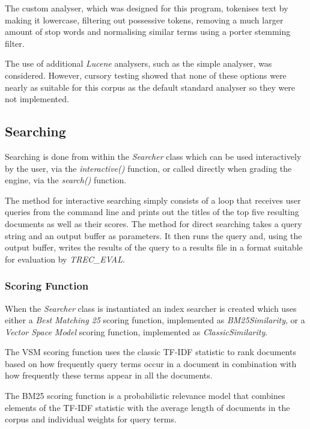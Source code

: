 \documentclass[journal]{IEEEtran}
\begin{document}
The custom analyser, which was designed for this program, tokenises text by making it lowercase, filtering out possessive tokens, removing a much larger amount of stop words\cite{ranksnl:stopwords} and normalising similar terms using a porter stemming filter.

The use of additional \textit{Lucene} analysers, such as the simple analyser, was considered. However, cursory testing showed that none of these options were nearly as suitable for this corpus as the default standard analyser so they were not implemented.

\subsection{Searching}

Searching is done from within the \textit{Searcher} class which can be used interactively by the user, via the \textit{interactive()} function, or called directly when grading the engine, via the \textit{search()} function.

The method for interactive searching simply consists of a loop that receives user queries from the command line and prints out the titles of the top five resulting documents as well as their scores. The method for direct searching takes a query string and an output buffer as parameters. It then runs the query and, using the output buffer, writes the results of the query to a results file in a format suitable for evaluation by \textit{TREC\_EVAL}.

\subsubsection{Scoring Function}

When the \textit{Searcher} class is instantiated an index searcher is created which uses either a \textit{Best Matching 25} scoring function, implemented as \textit{BM25Similarity}, or a \textit{Vector Space Model} scoring function, implemented as \textit{ClassicSimilarity}.

The VSM scoring function uses the classic TF-IDF statistic to rank documents based on how frequently query terms occur in a document in combination with how frequently these terms appear in all the documents. 

The BM25 scoring function is a probabilistic relevance model that combines elements of the TF-IDF statistic with the average length of documents in the corpus and individual weights for query terms.
\end{document}
